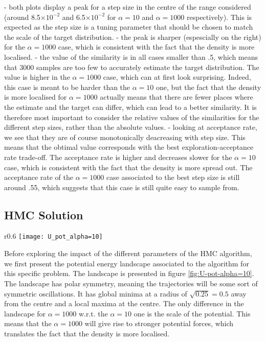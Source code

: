 \documentclass[a4paper, 12pt,oneside]{article}
\begin{document}
			- both plots display a peak for a step size in the centre of the range considered (around 8.5$\times 10^{-2}$ and 6.5$\times 10^{-2}$ for $\alpha=10$ and $\alpha=1000$ respectively). This is expected as the step size is a tuning parameter that should be chosen to match the scale of the target distribution.
			- the peak is sharper (espescially on the right) for the $\alpha=1000$ case, which is consistent with the fact that the density is more localised. 
			- the value of the similarity is in all cases smaller than .5, which means that 3000 samples are too few to accurately estimate the target distribution. The value is higher in the $\alpha=1000$ case, which can at first look surprising. Indeed, this case is meant to be harder than the $\alpha=10$ one, but the fact that the density is more localised for $\alpha=1000$ actually means that there are fewer places where the estimate and the target can differ, which can lead to a better similarity. It is therefore most important to consider the relative values of the similarities for the different step sizes, rather than the absolute values.
			- looking at acceptance rate, we see that they are of course monotonically deacreasing with step size. This means that the obtimal value corresponds with the best exploration-acceptance rate trade-off. The acceptance rate is higher and decreases slower for the $\alpha=10$ case, which is consistent with the fact that the density is more spread out. The acceptance rate of the $\alpha=1000$ case associated to the best step size is still around .55, which suggests that this case is still quite easy to sample from. 
		\subsection{HMC Solution}
			\begin{wrapfigure}[18]{r}{0.6\textwidth}
				\centering
					\vspace{-2em}
					\texttt{[image: U\_pot\_alpha=10]}
					\caption{Potential energy landscape associated to HMC algorithm for $\alpha=10$. Version for $\alpha=1000$ is identical, except scales are scaled by a factor of 100.}
					\label{fig:U-pot-alpha=10}
			\end{wrapfigure}
			Before exploring the impact of the different parameters of the HMC algorithm, we first present the potential energy landscape associated to the algorithm for this specific problem. The landscape is presented in figure \ref{fig:U-pot-alpha=10}. 
			The landscape has polar symmetry, meaning the trajectories will be some sort of symmetric oscillations. It has global minima at a radius of $\sqrt{0.25}=0.5$ away from the centre and a local maxima at the centre. The only difference in the landscape for $\alpha=1000$ w.r.t. the $\alpha=10$ one is the scale of the potential. This means that the $\alpha=1000$ will give rise to stronger potential forces, which translates the fact that the density is more localised. 
\end{document}
